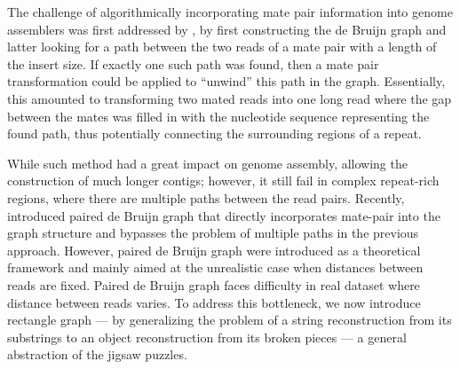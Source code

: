 \documentclass[a4paper]{article}
\begin{document}
The challenge of algorithmically incorporating mate pair information into genome
assemblers was first addressed by \cite{Pevzner01b}, by first constructing the de Bruijn
graph and latter looking for a path between the two reads of a mate pair with a length of the
insert size. If exactly one such path was found, then a mate pair transformation
could be applied to ``unwind'' this path in the graph. Essentially, this amounted
to transforming two mated reads into one long read where the gap between the
mates was filled in with the nucleotide sequence representing the found path,
thus potentially connecting the surrounding regions of a repeat.  

While such method had a great impact on genome assembly, allowing the construction of much longer contigs; 
however, it still fail in complex repeat-rich
regions, where there are multiple paths between the read pairs. Recently, ~\cite{Medvedev11} introduced
paired de Bruijn graph that directly incorporates mate-pair into the graph structure and bypasses the problem of multiple
paths in the previous approach. However, paired de Bruijn graph were introduced as a theoretical framework and mainly aimed 
at the unrealistic case when distances between reads are fixed. Paired de Bruijn graph faces difficulty in real dataset where 
distance between reads varies. To address this bottleneck, we now introduce rectangle graph --- by  generalizing the problem of a string 
reconstruction from its substrings to an object reconstruction from its broken pieces --- a general abstraction of the jigsaw puzzles. 

\end{document}

